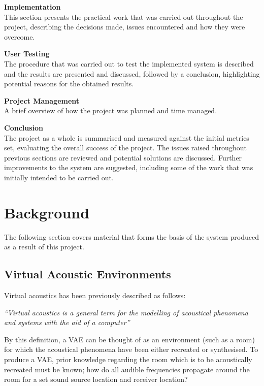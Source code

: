 \documentclass[../../main.tex]{subfiles}
\begin{document}
	\textbf{Implementation}\\
		This section presents the practical work that was carried out throughout the project, describing the decisions made, issues encountered and how they were overcome.

	\textbf{User Testing}\\	
		The procedure that was carried out to test the implemented system is described and the results are presented and discussed, followed by a conclusion, highlighting potential reasons for the obtained results.

	\textbf{Project Management}\\
		A brief overview of how the project was planned and time managed.

	\textbf{Conclusion}\\
		The project as a whole is summarised and measured against the initial metrics set, evaluating the overall success of the project. The issues raised throughout previous sections are reviewed and potential solutions are discussed. Further improvements to the system are suggested, including some of the work that was initially intended to be carried out.

\pagebreak
{}
\section{Background}
	
	The following section covers material that forms the basis of the system produced as a result of this project.

	\subsection{Virtual Acoustic Environments}

		 Virtual acoustics has been previously described \cite{Huopaniemi2000} as follows: 

		 \vspace{5mm}
		 \begin{center}
		 \begin{minipage}{0.5\textwidth}
		 \textit{``Virtual acoustics is a general term for the modelling of acoustical phenomena and systems with the aid of a computer''}
		 \end{minipage}
		 \end{center}
		 \vspace{5mm}

		By this definition, a \ac{VAE} can be thought of as an environment (such as a room) for which the acoustical phenomena have been either recreated or synthesised. To produce a \ac{VAE}, prior knowledge regarding the room which is to be acoustically recreated must be known; how do all audible frequencies propagate around the room for a set sound source location and receiver location?
\end{document}
